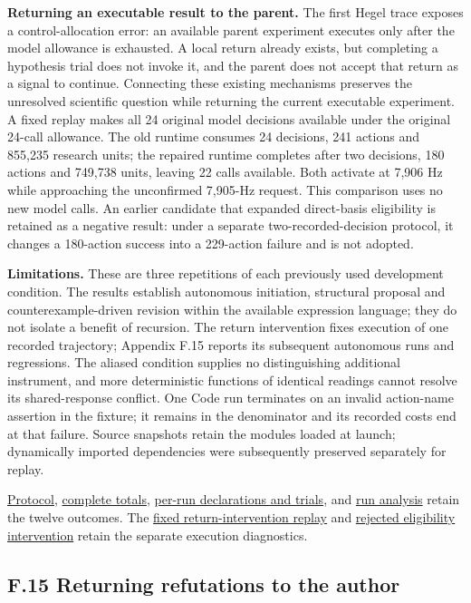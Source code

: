 \documentclass[twoside,11pt]{article}
\begin{document}
\textbf{Returning an executable result to the parent.} The first Hegel trace exposes a control-allocation error: an available parent experiment executes only after the model allowance is exhausted. A local return already exists, but completing a hypothesis trial does not invoke it, and the parent does not accept that return as a signal to continue. Connecting these existing mechanisms preserves the unresolved scientific question while returning the current executable experiment. A fixed replay makes all 24 original model decisions available under the original 24-call allowance. The old runtime consumes 24 decisions, 241 actions and 855,235 research units; the repaired runtime completes after two decisions, 180 actions and 749,738 units, leaving 22 calls available. Both activate at 7,906 Hz while approaching the unconfirmed 7,905-Hz request. This comparison uses no new model calls. An earlier candidate that expanded direct-basis eligibility is retained as a negative result: under a separate two-recorded-decision protocol, it changes a 180-action success into a 229-action failure and is not adopted.


\textbf{Limitations.} These are three repetitions of each previously used development condition. The results establish autonomous initiation, structural proposal and counterexample-driven revision within the available expression language; they do not isolate a benefit of recursion. The return intervention fixes execution of one recorded trajectory; Appendix F.15 reports its subsequent autonomous runs and regressions. The aliased condition supplies no distinguishing additional instrument, and more deterministic functions of identical readings cannot resolve its shared-response conflict. One Code run terminates on an invalid action-name assertion in the fixture; it remains in the denominator and its recorded costs end at that failure. Source snapshots retain the modules loaded at launch; dynamically imported dependencies were subsequently preserved separately for replay.


\hyperlink{artifact-111}{Protocol}, \hyperlink{artifact-112}{complete totals}, \hyperlink{artifact-113}{per-run declarations and trials}, and \hyperlink{artifact-114}{run analysis} retain the twelve outcomes. The \hyperlink{artifact-115}{fixed return-intervention replay} and \hyperlink{artifact-116}{rejected eligibility intervention} retain the separate execution diagnostics.


\subsection*{F.15 Returning refutations to the author}
\end{document}
